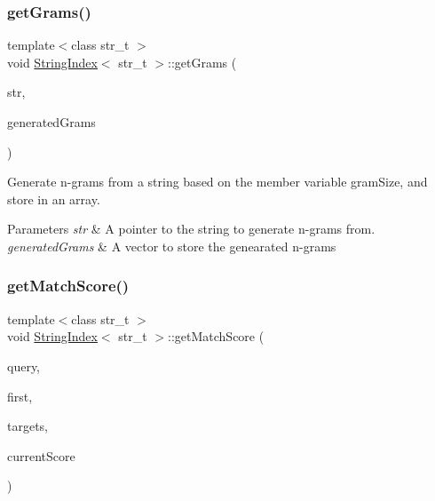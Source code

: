 \subsubsection{\texorpdfstring{get\+Grams()}{getGrams()}\hspace{0.1cm}{\footnotesize\ttfamily [2/2]}}
{\footnotesize\ttfamily template$<$class str\+\_\+t $>$ \\
void \mbox{\hyperlink{class_string_index}{String\+Index}}$<$ str\+\_\+t $>$\+::get\+Grams (\begin{DoxyParamCaption}\item[{const str\+\_\+t \&}]{str,  }\item[{std\+::vector$<$ str\+\_\+t $>$ \&}]{generated\+Grams }\end{DoxyParamCaption})}

Generate n-\/grams from a string based on the member variable {\ttfamily gram\+Size}, and store in an array. 
\begin{DoxyParams}{Parameters}
{\em str} & A pointer to the string to generate n-\/grams from. \\
\hline
{\em generated\+Grams} & A vector to store the genearated n-\/grams \\
\hline
\end{DoxyParams}
\mbox{\label{class_string_index_a32f2294a19ad5360bd62f1ede07c6c5e}} 
\subsubsection{\texorpdfstring{get\+Match\+Score()}{getMatchScore()}}
{\footnotesize\ttfamily template$<$class str\+\_\+t $>$ \\
void \mbox{\hyperlink{class_string_index}{String\+Index}}$<$ str\+\_\+t $>$\+::get\+Match\+Score (\begin{DoxyParamCaption}\item[{const str\+\_\+t \&}]{query,  }\item[{size\+\_\+t}]{first,  }\item[{std\+::vector$<$ str\+\_\+t $\ast$$>$ \&}]{targets,  }\item[{std\+::vector$<$ float $>$ \&}]{current\+Score }\end{DoxyParamCaption})}

